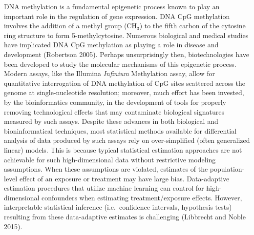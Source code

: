 \documentclass[9pt,a4paper,]{extarticle}
\theoremstyle{definition}
\theoremstyle{definition}
\theoremstyle{definition}
\theoremstyle{remark}
\begin{document}
DNA methylation is a fundamental epigenetic process known to play an
important role in the regulation of gene expression. DNA CpG methylation
involves the addition of a methyl group (\(\text{CH}_3\)) to the fifth
carbon of the cytosine ring structure to form 5-methylcytosine. Numerous
biological and medical studies have implicated DNA CpG methylation as
playing a role in disease and development (Robertson 2005). Perhaps
unsurprisingly then, biotechnologies have been developed to study the
molecular mechanisms of this epigenetic process. Modern assays, like the
Illumina \emph{Infinium} Methylation assay, allow for quantitative
interrogation of DNA methylation of CpG sites scattered across the
genome at single-nucleotide resolution; moreover, much effort has been
invested, by the bioinformatics community, in the development of tools
for properly removing technological effects that may contaminate
biological signatures measured by such assays. Despite these advances in
both biological and bioninformatical techniques, most statistical
methods available for differential analysis of data produced by such
assays rely on over-simplified (often generalized linear) models. This
is because typical statistical estimation approaches are not achievable
for such high-dimensional data without restrictive modeling assumptions.
When these assumptions are violated, estimates of the population-level
effect of an exposure or treatment may have large bias. Data-adaptive
estimation procedures that utilize machine learning can control for
high-dimensional confounders when estimating treatment/exposure effects.
However, interpretable statistical inference (i.e.~confidence intervals,
hypothesis tests) resulting from these data-adaptive estimates is
challenging (Libbrecht and Noble 2015).
\end{document}

